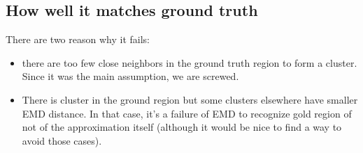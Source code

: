\subsection{How well it matches ground truth}

There are two reason why it fails:
\begin{itemize}
    \item there are too few close neighbors in the ground truth region to form a cluster. Since it was the main assumption, we are screwed.
    \item There is cluster in the ground region but some clusters elsewhere have smaller EMD distance. In that case, it's a failure of EMD to recognize gold region of not of the approximation itself (although it would be nice to find a way to avoid those cases).
\end{itemize}
